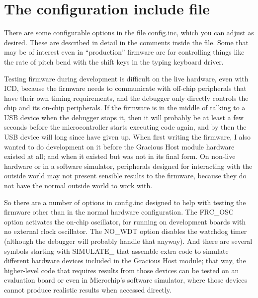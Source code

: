 \section{The configuration include file}

There are some configurable options in the file config.inc, which you can
adjust as desired.  These are described in detail in the comments inside the
file.  Some that may be of interest even in ``production'' firmware are for
controlling things like the rate of pitch bend with the shift keys in the
typing keyboard driver.

Testing firmware during development is difficult on the live hardware, even
with ICD, because the firmware needs to communicate with off-chip
peripherals that have their own timing requirements, and the debugger only
directly controls the chip and its on-chip peripherals.  If the firmware is
in the middle of talking to a USB device when the debugger stops it, then it
will probably be at least a few seconds before the microcontroller starts
executing code again, and by then the USB device will long since have given
up.  When first writing the firmware, I also wanted to do development on it
before the Gracious Host module hardware existed at all; and when it existed
but was not in its final form.  On non-live hardware or in a software
simulator, peripherals designed for interacting with the outside world may
not present sensible results to the firmware, because they do not have the
normal outside world to work with.

So there are a number of options in config.inc designed to help with testing
the firmware other than in the normal hardware configuration.  The FRC\_OSC
option activates the on-chip oscillator, for running on development boards
with no external clock oscillator.  The NO\_WDT option disables the watchdog
timer (although the debugger will probably handle that anyway).  And there
are several symbols starting with SIMULATE\_ that assemble extra code to
simulate different hardware devices included in the Gracious Host module;
that way, the higher-level code that requires results from those devices can
be tested on an evaluation board or even in Microchip's software simulator,
where those devices cannot produce realistic results when accessed directly.

